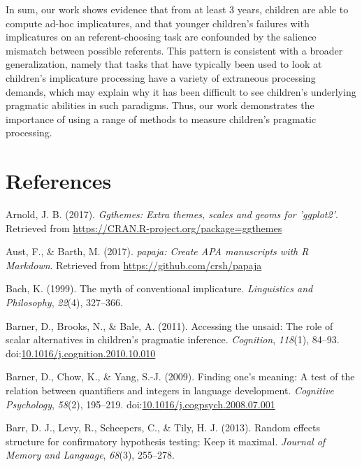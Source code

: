 \documentclass[man]{apa6}
\begin{document}
In sum, our work shows evidence that from at least 3 years, children are
able to compute ad-hoc implicatures, and that younger children's
failures with implicatures on an referent-choosing task are confounded
by the salience mismatch between possible referents. This pattern is
consistent with a broader generalization, namely that tasks that have
typically been used to look at children's implicature processing have a
variety of extraneous processing demands, which may explain why it has
been difficult to see children's underlying pragmatic abilities in such
paradigms. Thus, our work demonstrates the importance of using a range
of methods to measure children's pragmatic processing.

\newpage

\section{References}\label{references}

\setlength{\parindent}{-0.5in} \setlength{\leftskip}{0.5in}

\hypertarget{refs}{}
\hypertarget{ref-R-ggthemes}{}
Arnold, J. B. (2017). \emph{Ggthemes: Extra themes, scales and geoms for
'ggplot2'}. Retrieved from
\url{https://CRAN.R-project.org/package=ggthemes}

\hypertarget{ref-R-papaja}{}
Aust, F., \& Barth, M. (2017). \emph{papaja: Create APA manuscripts with
R Markdown}. Retrieved from \url{https://github.com/crsh/papaja}

\hypertarget{ref-bach1999}{}
Bach, K. (1999). The myth of conventional implicature. \emph{Linguistics
and Philosophy}, \emph{22}(4), 327--366.

\hypertarget{ref-barner2011}{}
Barner, D., Brooks, N., \& Bale, A. (2011). Accessing the unsaid: The
role of scalar alternatives in children's pragmatic inference.
\emph{Cognition}, \emph{118}(1), 84--93.
doi:\href{https://doi.org/10.1016/j.cognition.2010.10.010}{10.1016/j.cognition.2010.10.010}

\hypertarget{ref-barner2009}{}
Barner, D., Chow, K., \& Yang, S.-J. (2009). Finding one's meaning: A
test of the relation between quantifiers and integers in language
development. \emph{Cognitive Psychology}, \emph{58}(2), 195--219.
doi:\href{https://doi.org/10.1016/j.cogpsych.2008.07.001}{10.1016/j.cogpsych.2008.07.001}

\hypertarget{ref-barr2013random}{}
Barr, D. J., Levy, R., Scheepers, C., \& Tily, H. J. (2013). Random
effects structure for confirmatory hypothesis testing: Keep it maximal.
\emph{Journal of Memory and Language}, \emph{68}(3), 255--278.
\end{document}
